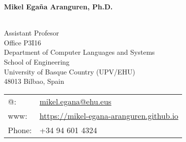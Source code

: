 \documentclass[11pt,fullpage]{article}
\newcommand{\etc}{\emph{etc.}}
\def\name{Mikel Ega\~na Aranguren, Ph.D.}
\begin{document}


\centerline{\Large \bf \name}

\vspace{0.25in}

\begin{minipage}{0.50\linewidth}
~\\
    Assistant Profesor \\




  Office P3I16 \\ 
  Department of Computer Languages and Systems \\
  School of Engineering \\
  University of Basque Country (UPV/EHU) \\
  48013 Bilbao, Spain \\


\end{minipage}
\begin{minipage}{0.50\linewidth}
  \begin{tabular}{ll}
    @: 
& \href{mailto:mikel.egana@ehu.eus}{mikel.egana@ehu.eus} \\
    www: & \href{https://mikel-egana-aranguren.github.io}{https://mikel-egana-aranguren.github.io} \\
    Phone: & +34 94 601 4324 \\

  \end{tabular}
\end{minipage}


\end{document}
